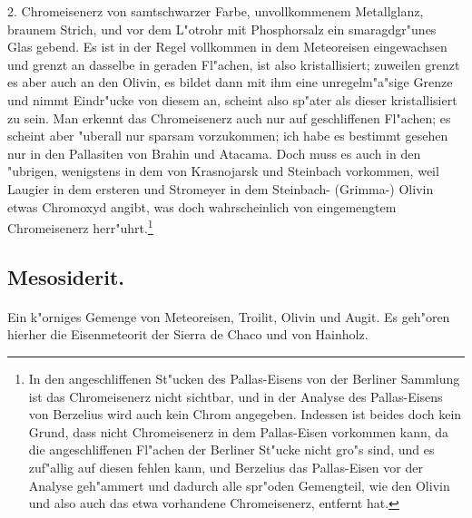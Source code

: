 \documentclass[a4paper, 11pt, oneside, german]{article}
\begin{document}
2. Chromeisenerz von samtschwarzer Farbe, unvollkommenem Metallglanz, braunem Strich, und vor dem L"otrohr mit Phosphorsalz ein smaragdgr"unes Glas gebend. Es ist in der Regel vollkommen in dem Meteoreisen eingewachsen und grenzt an dasselbe in geraden Fl"achen, ist also kristallisiert; zuweilen grenzt es aber auch an den Olivin, es bildet dann mit ihm eine unregelm"a"sige Grenze und nimmt Eindr"ucke von diesem an, scheint also sp"ater als dieser kristallisiert zu sein. Man erkennt das Chromeisenerz auch nur auf geschliffenen Fl"achen; es scheint aber "uberall nur sparsam vorzukommen; ich habe es bestimmt gesehen nur in den Pallasiten von Brahin und Atacama. Doch muss es auch in den "ubrigen, wenigstens in dem von Krasnojarsk und Steinbach vorkommen, weil Laugier in dem ersteren und Stromeyer in dem Steinbach- (Grimma-) Olivin etwas Chromoxyd angibt, was doch wahrscheinlich von eingemengtem Chromeisenerz herr"uhrt.\footnote{In den angeschliffenen St"ucken des Pallas-Eisens von der Berliner Sammlung ist das Chromeisenerz nicht sichtbar, und in der Analyse des Pallas-Eisens von Berzelius wird auch kein Chrom angegeben. Indessen ist beides doch kein Grund, dass nicht Chromeisenerz in dem Pallas-Eisen vorkommen kann, da die angeschliffenen Fl"achen der Berliner St"ucke nicht gro"s sind, und es zuf"allig auf diesen fehlen kann, und Berzelius das Pallas-Eisen vor der Analyse geh"ammert und dadurch alle spr"oden Gemengteil, wie den Olivin und also auch das etwa vorhandene Chromeisenerz, entfernt hat.}
\subsection{Mesosiderit.}
\paragraph{}
Ein k"orniges Gemenge von Meteoreisen, Troilit, Olivin und Augit. Es geh"oren hierher die Eisenmeteorit der Sierra de Chaco und von Hainholz.
\end{document}
